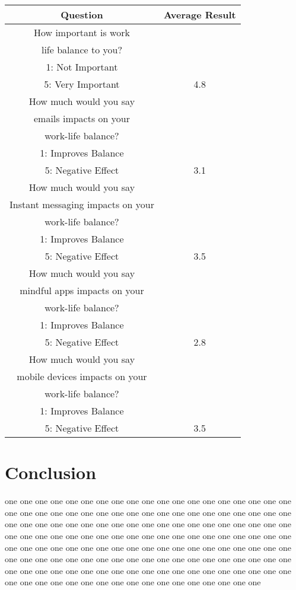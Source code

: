 \documentclass{sigchi}
\begin{document}
	
	\begin{center}
		\begin{tabular}{ |c| c | }
			\hline
			Question & Average Result  \\ 
			\hline
			How important is work & \\
			life balance to you? & \\
			1: Not Important & \\
			5: Very Important & 4.8 \\ 
			\hline
			How much would you say & \\
			emails impacts on your & \\
			work-life balance? & \\
			1: Improves Balance & \\
			5: Negative Effect & 3.1  \\ 
			\hline
			How much would you say & \\
			Instant messaging impacts on your & \\
			work-life balance? & \\
			1: Improves Balance & \\
			5: Negative Effect & 3.5 \\
			\hline
			How much would you say & \\
			mindful apps impacts on your & \\
			work-life balance? & \\
			1: Improves Balance & \\
			5: Negative Effect & 2.8 \\
			\hline
			How much would you say & \\
			mobile devices impacts on your & \\
			work-life balance? & \\
			1: Improves Balance & \\
			5: Negative Effect & 3.5 \\
			\hline
		\end{tabular}
	\end{center}

\section{Conclusion}
	 
	one one one one one one one one one one one one one one one one one one one one one one one one one one one one one one one one one one one one one one one one one one one one one one one one one one one one one one one one one one one one one one one one one one one one one one one one one one one one one one one one one one one one one one one one one one one one one one one one one one one one one one one one one one one one one one one one one one one one one one one one one one one one one one one one one one one one one one one one one one one one one one one one one one one one one one 
	
\balance{}



\end{document}
